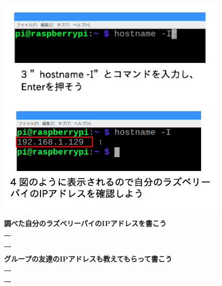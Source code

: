 \documentclass[a4paper,12pt,dvipdfmx]{jarticle}
\begin{document}
\includegraphics[width=0.85\textwidth]{ome7-img010.png}
\centering
\includegraphics[width=0.85\textwidth]{ome7-img009.png}
\flushleft


\bigskip


\bigskip


\bigskip


\bigskip

{\bfseries
	調べた自分のラズベリーパイのIPアドレスを書こう}

\bigskip


\centering
\begin{tabular}{|p{}|} \hline
	\\
	\\
	\\
	\\ \hline
\end{tabular}


\bigskip


\bigskip

\flushleft

{\bfseries
	グループの友達のIPアドレスも教えてもらって書こう}

\bigskip


\centering
\begin{tabular}{|p{}|} \hline
	\\
	\\
	\\
	\\ \hline
\end{tabular}
\end{document}
